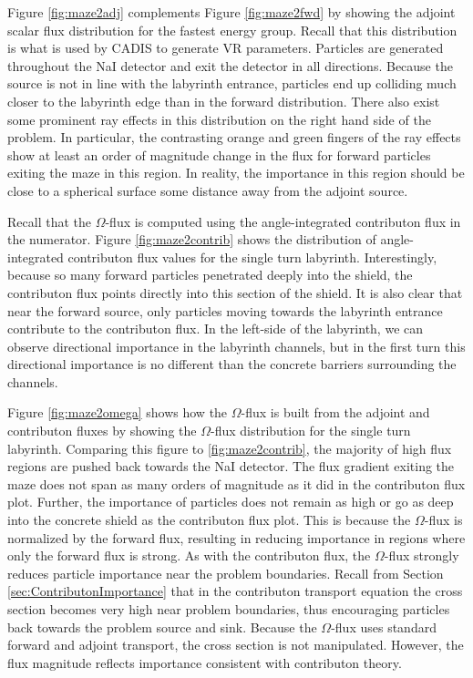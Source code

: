 Figure \ref{fig:maze2adj} complements Figure \ref{fig:maze2fwd} by showing the
adjoint scalar flux distribution for the fastest energy group. Recall that this
distribution is what is used by CADIS to generate VR parameters. Particles are
generated throughout the NaI detector and exit the detector in all directions.
Because the source is not in line with the labyrinth entrance, particles end up
colliding much closer to the labyrinth edge than in the forward distribution.
There also exist some prominent ray effects in this distribution on the right
hand side of the problem. In particular, the contrasting orange and green
fingers of the ray effects show at least an order of magnitude change in the
flux for forward particles exiting the maze in this region. In reality, the
importance in this region should be close to a spherical surface some distance
away from the adjoint source.

Recall that the $\Omega$-flux is computed using the angle-integrated contributon
flux in the numerator. 
 Figure \ref{fig:maze2contrib} shows the distribution of
angle-integrated contributon flux values for the single turn labyrinth.
Interestingly, because so many forward particles penetrated deeply into the
shield, the contributon flux points directly into this section of the shield. It
is also clear that near the forward source, only particles moving 
towards the labyrinth entrance contribute to the contributon flux.
In the left-side of the labyrinth, we can observe directional importance in the
labyrinth channels, but in the first turn this directional importance is no
different than the concrete barriers surrounding the channels.

Figure \ref{fig:maze2omega} shows how the $\Omega$-flux is built from the
adjoint and contributon fluxes by showing the $\Omega$-flux distribution for the
single turn labyrinth. Comparing this figure to \ref{fig:maze2contrib}, the
majority of high flux regions are pushed back towards the NaI detector. The
flux gradient exiting the maze does not span as many orders of magnitude as it
did in the contributon flux plot. Further, the importance of particles does
not remain as high or go as deep into the concrete shield as the contributon
flux plot. This is because the $\Omega$-flux is normalized by the forward flux,
resulting in reducing importance in regions where only the forward flux is
strong. As with the contributon flux, the $\Omega$-flux strongly reduces
particle importance near the problem boundaries. Recall from Section
\ref{sec:ContributonImportance} that in the contributon transport equation
the cross section becomes very high near problem boundaries, thus encouraging
particles back towards the problem source and sink. Because the $\Omega$-flux
uses standard forward and adjoint transport, the cross section is not
manipulated. However, the flux magnitude reflects importance consistent with
contributon theory.

